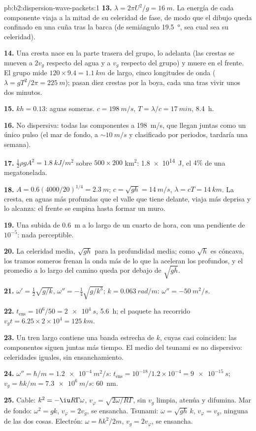 \begin{solution}{pb:b2:dispersion-wave-packets:1}
\textbf{13.} $\lambda = 2\pi U^2/g = \qty{16}{m}$. La energía de cada componente
viaja a la mitad de su celeridad de fase, de modo que el dibujo queda
confinado en una cuña tras la barca (de semiángulo \qty{19.5}{\degree}, sea
cual sea su celeridad).

\textbf{14.} Una cresta nace en la parte trasera del grupo, lo adelanta
(las crestas se mueven a $2v_g$ respecto del agua y a $v_g$ respecto del
grupo) y muere en el frente. El grupo mide $120 \times 9.4 = \qty{1.1}{km}$
de largo, cinco longitudes de onda ($\lambda = gT^2/2\pi = \qty{225}{m}$); pasan diez crestas por
la boya, cada una tras vivir unos dos minutos.

\textbf{15.} $kh = 0.13$: aguas someras. $c = \qty{198}{m/s}$, $T = \lambda/c = \qty{17}{min}$,
\qty{8.4}{h}.

\textbf{16.} No dispersiva: todas las componentes a \qty{198}{m/s}, que
llegan juntas como un único pulso (el mar de fondo, a $\sim\qty{10}{m/s}$ y
clasificado por periodos, tardaría una semana).

\textbf{17.} $\tfrac12\rho gA^2 = \qty{1.8}{kJ/m^2}$ sobre $500 \times 200$ km$^2$: \qty{1.8e14}{J},
el $4\%$ de una megatonelada.

\textbf{18.} $A = 0.6(4000/20)^{1/4} = \qty{2.3}{m}$; $c = \sqrt{gh} = \qty{14}{m/s}$, $\lambda =
cT = \qty{14}{km}$. La cresta, en aguas más profundas que el valle que
tiene delante, viaja más deprisa y lo alcanza: el frente se empina hasta
formar un muro.

\textbf{19.} Una subida de \qty{0.6}{m} a lo largo de un cuarto de hora,
con una pendiente de $10^{-5}$: nada perceptible.

\textbf{20.} La celeridad media, $\sqrt{gh}$ para la profundidad media;
como $\sqrt h$ es cóncava, los tramos someros frenan la onda más de lo que
la aceleran los profundos, y el promedio a lo largo del camino queda por
debajo de $\sqrt{g\bar h}$.

\textbf{21.} $\omega' = \tfrac12\sqrt{g/k}$, $\omega'' = -\tfrac14\sqrt{g/k^3}$; $k = \qty{0.063}{rad/m}$:
$\omega'' = \qty{-50}{m^2/s}$.

\textbf{22.} $t_{\text{ens}} = 10^6/50 = \qty{2e4}{s}$, \qty{5.6}{h}; el paquete
ha recorrido $v_gt = 6.25 \times 2 \times 10^4 = \qty{125}{km}$.

\textbf{23.} Un tren largo contiene una banda estrecha de $k$, cuyas
 casi coinciden: las componentes siguen juntas más
tiempo. El medio del tsunami es no dispersivo: celeridades iguales, sin
ensanchamiento.

\textbf{24.} $\omega'' = \hbar/m = \qty{1.2e-4}{m^2/s}$: $t_{\text{ens}} = 10^{-18}/1.2 \times
10^{-4} = \qty{9e-15}{s}$; $v_g = \hbar k/m = \qty{7.3e6}{m/s}$: \qty{60}{nm}.

\textbf{25.} Cable: $k^2 = -\iu R\Gamma\omega$, $v_\varphi = \sqrt{2\omega/R\Gamma}$, sin
$v_g$ limpia, atenúa y difumina. Mar de fondo: $\omega^2 = gk$, $v_\varphi = 2v_g$,
se ensancha. Tsunami: $\omega = \sqrt{gh}\,k$, $v_\varphi = v_g$, ninguna de las
dos cosas. Electrón: $\omega = \hbar k^2/2m$, $v_g = 2v_\varphi$, se ensancha.
\end{solution}
